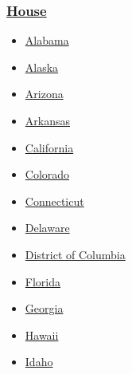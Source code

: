 \hypertarget{house}{%
\subsubsection{\texorpdfstring{\href{https://www.nytimes3xbfgragh.onion/elections/results/house}{House}}{House}}\label{house}}

\begin{itemize}
\tightlist
\item
  \href{https://www.nytimes3xbfgragh.onion/elections/results/alabama}{Alabama}
\item
  \href{https://www.nytimes3xbfgragh.onion/elections/results/alaska}{Alaska}
\item
  \href{https://www.nytimes3xbfgragh.onion/elections/results/arizona}{Arizona}
\item
  \href{https://www.nytimes3xbfgragh.onion/elections/results/arkansas}{Arkansas}
\item
  \href{https://www.nytimes3xbfgragh.onion/elections/results/california}{California}
\item
  \href{https://www.nytimes3xbfgragh.onion/elections/results/colorado}{Colorado}
\item
  \href{https://www.nytimes3xbfgragh.onion/elections/results/connecticut}{Connecticut}
\item
  \href{https://www.nytimes3xbfgragh.onion/elections/results/delaware}{Delaware}
\item
  \href{https://www.nytimes3xbfgragh.onion/elections/results/district-of-columbia}{District
  of Columbia}
\item
  \href{https://www.nytimes3xbfgragh.onion/elections/results/florida}{Florida}
\item
  \href{https://www.nytimes3xbfgragh.onion/elections/results/georgia}{Georgia}
\item
  \href{https://www.nytimes3xbfgragh.onion/elections/results/hawaii}{Hawaii}
\item
  \href{https://www.nytimes3xbfgragh.onion/elections/results/idaho}{Idaho}
\end{itemize}

